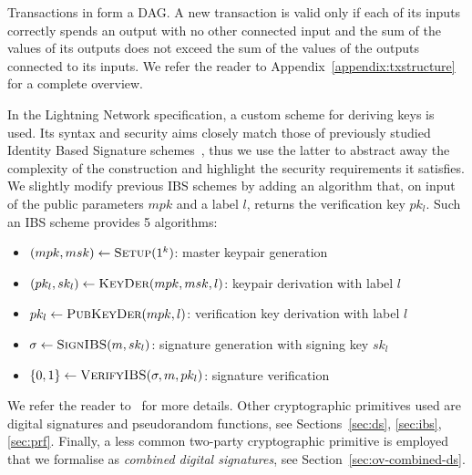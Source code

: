     Transactions in \ledger{} form a DAG. A new transaction is valid only if
    each of its inputs correctly spends an output with no other connected input
    and the sum of the values of its outputs does not exceed the sum of the
    values of the outputs connected to its inputs. We refer the reader to
    Appendix~\ref{appendix:txstructure} for a complete overview.

    In the Lightning Network specification, a custom scheme for deriving keys is
    used. Its syntax and security aims closely match those of previously studied
    Identity Based Signature schemes~\cite{ibsshamir,ibspaterson}, thus we use
    the latter to abstract away the complexity of the construction and highlight
    the security requirements it satisfies. We slightly modify previous IBS
    schemes by adding an algorithm that, on input of the public parameters $mpk$
    and a label $l$, returns the verification key $pk_l$. Such an IBS scheme
    provides 5 algorithms:
    \begin{itemize}
      \item $(mpk, msk) \leftarrow \textsc{Setup}(1^k)$: master keypair
      generation
      \item $(pk_l, sk_l) \leftarrow \textsc{KeyDer}(mpk, msk, l)$: keypair
      derivation with label $l$
      \item $pk_l \leftarrow \textsc{PubKeyDer}(mpk, l)$: verification key
      derivation with label $l$
      \item $\sigma \leftarrow \textsc{SignIBS}(m, sk_l)$: signature generation
      with signing key $sk_l$
      \item $\{0, 1\} \leftarrow \textsc{VerifyIBS}(\sigma, m, pk_l)$: signature
      verification
    \end{itemize}
    We refer the reader to~\cite{ibspaterson} for more details. 
    Other cryptographic primitives used are digital signatures and pseudorandom functions, see Sections~\ref{sec:ds}, \ref{sec:ibs}, \ref{sec:prf}. Finally, a less common  two-party cryptographic primitive is employed that we formalise as {\em  combined digital signatures}, see Section~\ref{sec:ov-combined-ds}. 
